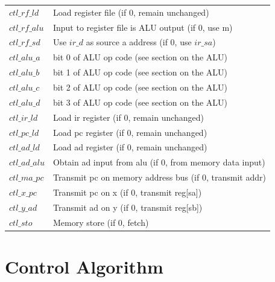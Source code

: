 \documentclass[a4paper,openany,fleqn]{book}
\begin{document}
\begin{tabular}[c]{|l|l|}
  \hline
  $ctl\_rf\_ld$ &  Load  register file (if 0, remain unchanged) \\
  $ctl\_rf\_alu$ &  Input to register file is ALU output (if 0, use m) \\
  $ctl\_rf\_sd$ &  Use $ir\_d$ as source a address (if 0, use $ir\_sa$) \\
  $ctl\_alu\_a$ &  bit 0 of ALU op code (see section on the ALU) \\
  $ctl\_alu\_b$ &  bit 1 of ALU op code (see section on the ALU) \\
  $ctl\_alu\_c$ &  bit 2 of ALU op code (see section on the ALU) \\
  $ctl\_alu\_d$ &  bit 3 of ALU op code (see section on the ALU) \\
  $ctl\_ir\_ld$ &  Load ir register (if 0, remain unchanged) \\
  $ctl\_pc\_ld$ &  Load pc register (if 0, remain unchanged) \\
  $ctl\_ad\_ld$ &  Load ad register (if 0, remain unchanged) \\
  $ctl\_ad\_alu$ &  Obtain ad input from alu (if 0, from memory data
    input) \\
  $ctl\_ma\_pc$ &  Transmit pc on memory address bus (if 0, transmit
  addr) \\
  $ctl\_x\_pc$  &  Transmit pc on x (if 0, transmit reg[sa]) \\
  $ctl\_y\_ad$  &  Transmit ad on y (if 0, transmit reg[sb]) \\
  $ctl\_sto $  &  Memory store (if 0, fetch) \\
  \hline
\end{tabular}


\section{Control Algorithm}
\label{sec:control-algorithm}
\end{document}
